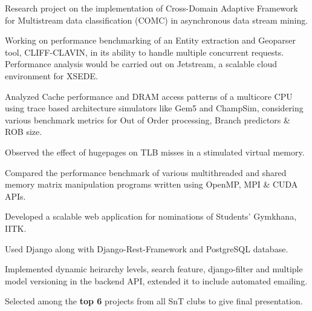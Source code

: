 \documentclass[]{deedy-resume-openfont}
\begin{document}
\begin{minipage}[t]{0.70\textwidth}
\vspace{0.1cm}
\vspace{0cm} %
\begin{tightemize}
  \item Research project on the implementation of Cross-Domain Adaptive Framework for Multistream data classification (COMC) in asynchronous data stream mining. 
  \item Working on performance benchmarking of an Entity extraction and Geoparser tool, CLIFF-CLAVIN, in its ability to handle multiple concurrent requests. Performance analysis would be carried out on Jetstream, a scalable cloud environment for XSEDE.
\end{tightemize}

\vspace{0.1cm}
\vspace{0cm} %
\begin{tightemize}
\item Analyzed Cache performance and DRAM access patterns of a multicore CPU using trace based architecture simulators like Gem5 and ChampSim, considering various benchmark metrics for Out of Order processing, Branch predictors \& ROB size.
  \item Observed the effect of hugepages on TLB misses in a stimulated virtual memory.
  \item Compared the performance benchmark of various multithreaded and shared memory matrix manipulation programs written using OpenMP, MPI \& CUDA APIs.
\end{tightemize}

\vspace{0.1cm}
\vspace{0cm} %
\begin{tightemize}
  \item Developed a scalable web application for nominations of Students' Gymkhana, IITK.
  \item Used Django along with Django-Rest-Framework and PostgreSQL database.
  \item	Implemented dynamic heirarchy levels, search feature, django-filter and multiple model versioning in the backend API, extended it to include automated emailing.
  \item	Selected among the \textbf{top 6} projects from all SnT clubs to give final presentation.
\end{tightemize}


\end{minipage}
\end{document}
